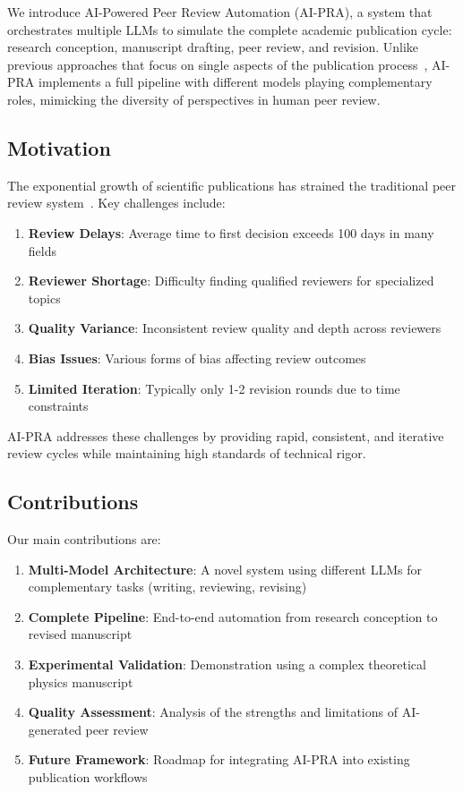 \documentclass[11pt,a4paper]{article}
\begin{document}
We introduce AI-Powered Peer Review Automation (AI-PRA), a system that orchestrates multiple LLMs to simulate the complete academic publication cycle: research conception, manuscript drafting, peer review, and revision. Unlike previous approaches that focus on single aspects of the publication process~\cite{checco2021ai,nuijten2016prevalence}, AI-PRA implements a full pipeline with different models playing complementary roles, mimicking the diversity of perspectives in human peer review.

\subsection{Motivation}

The exponential growth of scientific publications has strained the traditional peer review system~\cite{bornmann2015growth}. Key challenges include:

\begin{enumerate}
    \item \textbf{Review Delays}: Average time to first decision exceeds 100 days in many fields~\cite{powell2016waiting}
    \item \textbf{Reviewer Shortage}: Difficulty finding qualified reviewers for specialized topics~\cite{publons2018global}
    \item \textbf{Quality Variance}: Inconsistent review quality and depth across reviewers~\cite{justice1998masking}
    \item \textbf{Bias Issues}: Various forms of bias affecting review outcomes~\cite{tomkins2017reviewer}
    \item \textbf{Limited Iteration}: Typically only 1-2 revision rounds due to time constraints~\cite{ware2015stm}
\end{enumerate}

AI-PRA addresses these challenges by providing rapid, consistent, and iterative review cycles while maintaining high standards of technical rigor.

\subsection{Contributions}

Our main contributions are:

\begin{enumerate}
    \item \textbf{Multi-Model Architecture}: A novel system using different LLMs for complementary tasks (writing, reviewing, revising)
    \item \textbf{Complete Pipeline}: End-to-end automation from research conception to revised manuscript
    \item \textbf{Experimental Validation}: Demonstration using a complex theoretical physics manuscript
    \item \textbf{Quality Assessment}: Analysis of the strengths and limitations of AI-generated peer review
    \item \textbf{Future Framework}: Roadmap for integrating AI-PRA into existing publication workflows
\end{enumerate}
\end{document}
